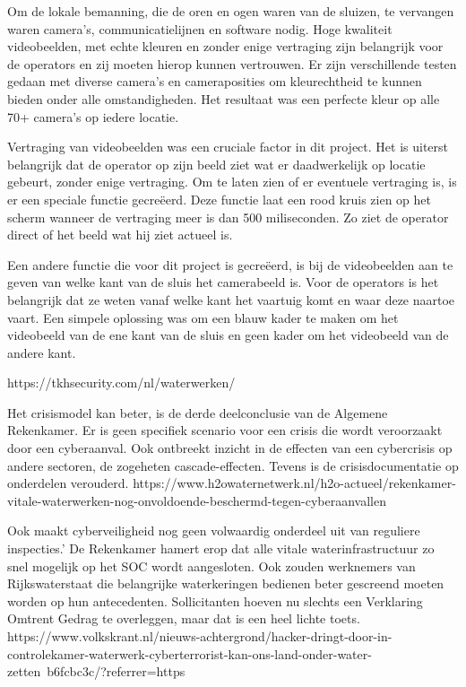 Om de lokale bemanning, die de oren en ogen waren van de sluizen, te vervangen waren camera’s, communicatielijnen en software nodig. Hoge kwaliteit videobeelden, met echte kleuren en zonder enige vertraging zijn belangrijk voor de operators en zij moeten hierop kunnen vertrouwen. Er zijn verschillende testen gedaan met diverse camera’s en cameraposities om kleurechtheid te kunnen bieden onder alle omstandigheden. Het resultaat was een perfecte kleur op alle 70+ camera’s op iedere locatie.

Vertraging van videobeelden was een cruciale factor in dit project. Het is uiterst belangrijk dat de operator op zijn beeld ziet wat er daadwerkelijk op locatie gebeurt, zonder enige vertraging. Om te laten zien of er eventuele vertraging is, is er een speciale functie gecreëerd. Deze functie laat een rood kruis zien op het scherm wanneer de vertraging meer is dan 500 miliseconden. Zo ziet de operator direct of het beeld wat hij ziet actueel is. 

Een andere functie die voor dit project is gecreëerd, is bij de videobeelden aan te geven van welke kant van de sluis het camerabeeld is. Voor de operators is het belangrijk dat ze weten vanaf welke kant het vaartuig komt en waar deze naartoe vaart. Een simpele oplossing was om een blauw kader te maken om het videobeeld van de ene kant van de sluis en geen kader om het videobeeld van de andere kant. 

https://tkhsecurity.com/nl/waterwerken/

Het crisismodel kan beter, is de derde deelconclusie van de Algemene Rekenkamer. Er is geen specifiek scenario voor een crisis die wordt veroorzaakt door een cyberaanval. Ook ontbreekt inzicht in de effecten van een cybercrisis op andere sectoren, de zogeheten cascade-effecten. Tevens is de crisisdocumentatie op onderdelen verouderd.
https://www.h2owaternetwerk.nl/h2o-actueel/rekenkamer-vitale-waterwerken-nog-onvoldoende-beschermd-tegen-cyberaanvallen


Ook maakt cyberveiligheid nog geen volwaardig onderdeel uit van reguliere inspecties.’ De Rekenkamer hamert erop dat alle vitale waterinfrastructuur zo snel mogelijk op het SOC wordt aangesloten. Ook zouden werknemers van Rijkswaterstaat die belangrijke waterkeringen bedienen beter gescreend moeten worden op hun antecedenten. Sollicitanten hoeven nu slechts een Verklaring Omtrent Gedrag te overleggen, maar dat is een heel lichte toets.
https://www.volkskrant.nl/nieuws-achtergrond/hacker-dringt-door-in-controlekamer-waterwerk-cyberterrorist-kan-ons-land-onder-water-zetten~b6fcbc3c/?referrer=https%

